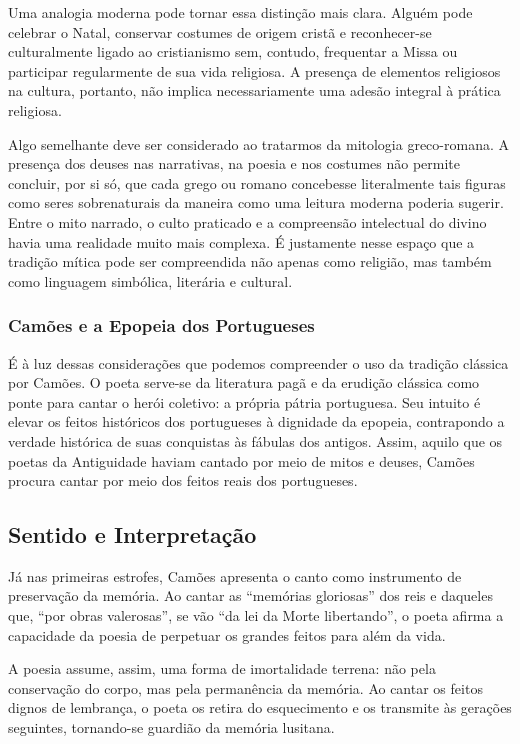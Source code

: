 Uma analogia moderna pode tornar essa distinção mais clara. Alguém pode
celebrar o Natal, conservar costumes de origem cristã e reconhecer-se
culturalmente ligado ao cristianismo sem, contudo, frequentar a Missa ou
participar regularmente de sua vida religiosa. A presença de elementos
religiosos na cultura, portanto, não implica necessariamente uma adesão
integral à prática religiosa.

Algo semelhante deve ser considerado ao tratarmos da mitologia greco-romana.
A presença dos deuses nas narrativas, na poesia e nos costumes não permite
concluir, por si só, que cada grego ou romano concebesse literalmente tais
figuras como seres sobrenaturais da maneira como uma leitura moderna poderia
sugerir. Entre o mito narrado, o culto praticado e a compreensão intelectual
do divino havia uma realidade muito mais complexa. É justamente nesse espaço
que a tradição mítica pode ser compreendida não apenas como religião, mas
também como linguagem simbólica, literária e cultural.

\subsubsection{Camões e a Epopeia dos Portugueses}

É à luz dessas considerações que podemos compreender o uso da tradição clássica
por Camões. O poeta serve-se da literatura pagã e da erudição clássica como
ponte para cantar o herói coletivo: a própria pátria portuguesa. Seu intuito é
elevar os feitos históricos dos portugueses à dignidade da epopeia, contrapondo
a verdade histórica de suas conquistas às fábulas dos antigos. Assim, aquilo
que os poetas da Antiguidade haviam cantado por meio de mitos e deuses, Camões
procura cantar por meio dos feitos reais dos portugueses.

\newpage

\subsection{Sentido e Interpretação}

Já nas primeiras estrofes, Camões apresenta o canto como instrumento de
preservação da memória. Ao cantar as ``memórias gloriosas'' dos reis e daqueles
que, ``por obras valerosas'', se vão ``da lei da Morte libertando'', o poeta
afirma a capacidade da poesia de perpetuar os grandes feitos para além da vida.

A poesia assume, assim, uma forma de imortalidade terrena: não pela conservação
do corpo, mas pela permanência da memória. Ao cantar os feitos dignos de
lembrança, o poeta os retira do esquecimento e os transmite às gerações
seguintes, tornando-se guardião da memória lusitana.

